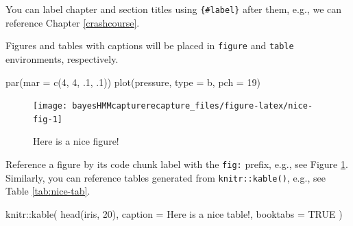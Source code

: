 \documentclass[
  12pt,
]{krantz}
\newenvironment{Shaded}{\begin{snugshade}}{\end{snugshade}}
\newcommand{\AttributeTok}[1]{\textcolor[rgb]{0.77,0.63,0.00}{#1}}
\newcommand{\ConstantTok}[1]{\textcolor[rgb]{0.00,0.00,0.00}{#1}}
\newcommand{\DecValTok}[1]{\textcolor[rgb]{0.00,0.00,0.81}{#1}}
\newcommand{\FunctionTok}[1]{\textcolor[rgb]{0.00,0.00,0.00}{#1}}
\newcommand{\NormalTok}[1]{#1}
\newcommand{\SpecialCharTok}[1]{\textcolor[rgb]{0.00,0.00,0.00}{#1}}
\newcommand{\StringTok}[1]{\textcolor[rgb]{0.31,0.60,0.02}{#1}}
\begin{document}
You can label chapter and section titles using \texttt{\{\#label\}} after them, e.g., we can reference Chapter \ref{crashcourse}.

Figures and tables with captions will be placed in \texttt{figure} and \texttt{table} environments, respectively.

\begin{Shaded}
\begin{Highlighting}[]
\FunctionTok{par}\NormalTok{(}\AttributeTok{mar =} \FunctionTok{c}\NormalTok{(}\DecValTok{4}\NormalTok{, }\DecValTok{4}\NormalTok{, .}\DecValTok{1}\NormalTok{, .}\DecValTok{1}\NormalTok{))}
\FunctionTok{plot}\NormalTok{(pressure, }\AttributeTok{type =} \StringTok{\textquotesingle{}b\textquotesingle{}}\NormalTok{, }\AttributeTok{pch =} \DecValTok{19}\NormalTok{)}
\end{Highlighting}
\end{Shaded}

\begin{figure}

{\centering \texttt{[image: bayesHMMcapturerecapture\_files/figure-latex/nice-fig-1]} 

}

\caption{Here is a nice figure!}\label{fig:nice-fig}
\end{figure}

Reference a figure by its code chunk label with the \texttt{fig:} prefix, e.g., see Figure \ref{fig:nice-fig}. Similarly, you can reference tables generated from \texttt{knitr::kable()}, e.g., see Table \ref{tab:nice-tab}.

\begin{Shaded}
\begin{Highlighting}[]
\NormalTok{knitr}\SpecialCharTok{::}\FunctionTok{kable}\NormalTok{(}
  \FunctionTok{head}\NormalTok{(iris, }\DecValTok{20}\NormalTok{), }\AttributeTok{caption =} \StringTok{\textquotesingle{}Here is a nice table!\textquotesingle{}}\NormalTok{,}
  \AttributeTok{booktabs =} \ConstantTok{TRUE}
\NormalTok{)}
\end{Highlighting}
\end{Shaded}
\end{document}
